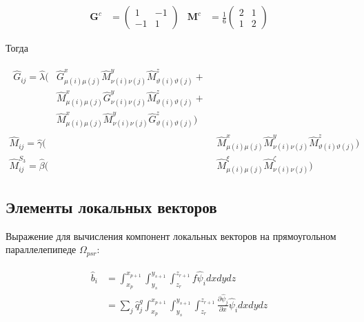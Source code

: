 \documentclass[12pt, a4paper]{article}
\begin{document}
\begin{align}
  \textbf{G}^c &= 
    \begin{pmatrix}
       1 & -1 \\
      -1 &  1
    \end{pmatrix} &
  \textbf{M}^c &= \frac{1}{6}
    \begin{pmatrix}
      2 & 1 \\
      1 & 2
    \end{pmatrix}
\end{align}

\vspace{5mm}
\noindent Тогда

\begin{align}
  \begin{split}
    \hat{G}_{ij} = \hat{\lambda}(
      &\hat{G}_{\mu(i)\mu(j)}^{x} \hat{M}_{\nu(i)\nu(j)}^{y} \hat{M}_{\vartheta(i)\vartheta(j)}^{z} + \\
      &\hat{M}_{\mu(i)\mu(j)}^{x} \hat{G}_{\nu(i)\nu(j)}^{y} \hat{M}_{\vartheta(i)\vartheta(j)}^{z} + \\
      &\hat{M}_{\mu(i)\mu(j)}^{x} \hat{M}_{\nu(i)\nu(j)}^{y} \hat{G}_{\vartheta(i)\vartheta(j)}^{z}
    )
  \end{split} \\[1ex]
  \hat{M}_{ij} = \hat{\gamma}(
    &\hat{M}_{\mu(i)\mu(j)}^x 
     \hat{M}_{\nu(i)\nu(j)}^y 
     \hat{M}_{\vartheta(i)\vartheta(j)}^z
  ) \\[1ex]
  \hat{M}_{ij}^{S_3} = \hat{\beta}(
    &\hat{M}_{\mu(i)\mu(j)}^{\xi} 
     \hat{M}_{\nu(i)\nu(j)}^{\zeta} 
  )
\end{align}

\subsection{Элементы локальных векторов}

\noindent Выражение для вычисления компонент локальных векторов на 
прямоугольном параллелепипеде $\Omega_{psr}$:

\begin{align}
  \begin{split}
    \hat{b}_i 
      &= \int_{x_p}^{x_{p+1}}
        \int_{y_s}^{y_{s+1}}
        \int_{z_r}^{z_{r+1}}
          f\hat{\psi}_i dxdydz \\
      &= \sum_{j}\hat{q}_j^g
        \int_{x_p}^{x_{p+1}}
        \int_{y_s}^{y_{s+1}}
        \int_{z_r}^{z_{r+1}}
          \frac{\partial{\hat{\psi}_j}}{\partial{x}}\hat{\psi}_i dxdydz
  \end{split}
\end{align}
\end{document}
